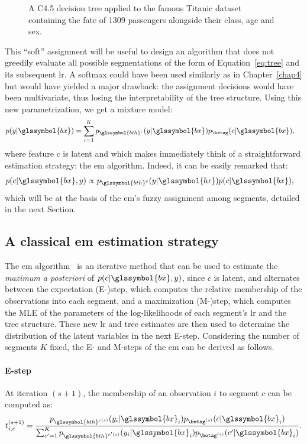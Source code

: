 \begin{figure}
\resizebox{\textwidth}{!}{}
\caption{A C4.5 decision tree applied to the famous Titanic dataset containing the fate of 1309 passengers alongside their class, age and sex.}
\label{fig:titanic_tree}
\end{figure}

This ``soft'' assignment will be useful to design an algorithm that does not greedily evaluate all possible segmentations of the form of Equation~\eqref{eq:tree} and its subsequent \gls{lr}. A softmax could have been used similarly as in Chapter~\ref{chap4} but would have yielded a major drawback: the assignment decisions would have been multivariate, thus losing the interpretability of the tree structure. Using this new parametrization, we get a mixture model:
\begin{align*}
p(y | \glssymbol{bx}) & = \sum_{c = 1}^K p_{\glssymbol{bth}^c}(y | \glssymbol{bx}) p_{\betag}(c | \glssymbol{bx}),
\end{align*}
where feature $c$ is latent and which makes immediately think of a straightforward estimation strategy: the \gls{em} algorithm. Indeed, it can be easily remarked that:
\begin{align*}
p(c | \glssymbol{bx}, y) & \propto p_{\glssymbol{bth}^c}(y | \glssymbol{bx}) p(c | \glssymbol{bx}),
\end{align*}
which will be at the basis of the \gls{em}'s fuzzy assignment among segments, detailed in the next Section.

\subsection{A classical \gls{em} estimation strategy}

The \gls{em} algorithm~\cite{dempster1977maximum} is an iterative method that can be used to estimate the \textit{maximum a posteriori} of $p(c | \glssymbol{bx}, y)$, since $c$ is latent, and alternates between the expectation (E-)step, which computes the relative membership of the observations into each segment, and a maximization (M-)step, which computes the MLE of the parameters of the log-likelihoods of each segment's \gls{lr} and the tree structure. These new \gls{lr} and tree estimates are then used to determine the distribution of the latent variables in the next E-step. Considering the number of segments $K$ fixed, the E- and M-steps of the \gls{em} can be derived as follows.

\paragraph{E-step}
At iteration $(s+1)$, the membership of an observation $i$ to segment $c$ can be computed as:
\[ t_{i,c}^{(s+1)} = \frac{p_{\glssymbol{bth}^{c(s)}}(y_i | \glssymbol{bx}_i) p_{\betag^{(s)}}(c | \glssymbol{bx}_i) }{ \sum_{c'=1}^K p_{\glssymbol{bth}^{c{'}{(s)}}}(y_i | \glssymbol{bx}_i) p_{\betag^{(s)}}(c{'} | \glssymbol{bx}_i) }.\]

